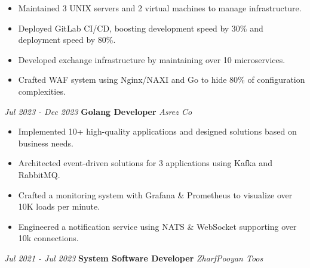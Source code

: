 \documentclass{engineercv}
\begin{document}
\begin{itemize}
  \item Maintained 3 UNIX servers and 2 virtual machines to manage infrastructure.
  \item Deployed GitLab CI/CD, boosting development speed by 30\% and deployment speed by 80\%.
  \item Developed exchange infrastructure by maintaining over 10 microservices.
  \item Crafted WAF system using Nginx/NAXI and Go to hide 80\% of configuration complexities.

\end{itemize}

\begin{twocolentry}{\textit{Jul 2023 - Dec 2023}}
  \textbf{Golang Developer}
  \textit{Asrez Co}
\end{twocolentry}

\begin{itemize}
  \item Implemented 10+ high-quality applications and designed solutions based on business needs.
  \item Architected event-driven solutions for 3 applications using Kafka and RabbitMQ.
  \item Crafted a monitoring system with Grafana \& Prometheus to visualize over 10K loads per minute.
  \item Engineered a notification service using NATS \& WebSocket supporting over 10k connections.
\end{itemize}

\begin{twocolentry}{\textit{Jul 2021 - Jul 2023}}
  \textbf{System Software Developer}
  \textit{ZharfPooyan Toos}
\end{twocolentry}
\end{document}
